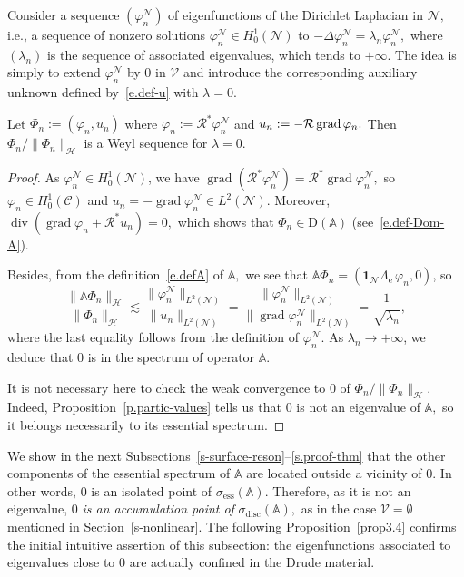 \documentclass[AHL,Unicode,longabstracts]{cedram}
\DeclareMathOperator{\Div}{div}
\DeclareMathOperator{\grad}{grad}
\DeclareMathOperator{\ess}{ess}
\DeclareMathOperator{\disc}{disc}
\newcommand{\calC}{\mathcal{C}}
\newcommand{\calH}{\mathcal{H}}
\newcommand{\calN}{\mathcal{N}}
\newcommand{\calR}{\mathcal{R}}
\newcommand{\calV}{\mathcal{V}}
\newcommand{\bbA}{\mathbb{A}}
\newcommand{\rmD}{{\mathrm{D}}}
\newcommand{\Un}{\boldsymbol{1}}
\newcommand{\Le}{{\Lambda_{\mathrm{e}}}}
\begin{document}
Consider a sequence $(\varphi_n^\calN)$ of eigenfunctions of the Dirichlet Laplacian in $\calN,$ i.e., a sequence of nonzero solutions $\varphi_n^\calN \in H^1_0(\calN)$ to $-\Delta \varphi_n^\calN = \lambda_n \varphi_n^\calN,$ where $(\lambda_n)$ is the sequence of associated eigenvalues, which tends to $+\infty.$ The idea is simply to extend $\varphi_n^\calN$ by 0 in $\calV$ and introduce the corresponding auxiliary unknown defined by~\eqref{e.def-u} with $\lambda=0.$
\pagebreak


\begin{prop}\label{p-Weyl-bulk}
Let $\Phi_n := (\varphi_n,u_n)$ where $\varphi_n := \calR^* \varphi_n^\calN$ and $u_n :=\linebreak- \calR \grad \varphi_n.$ Then $\Phi_n/\|\Phi_n\|_\calH$ is a Weyl sequence for $\lambda = 0.$
\end{prop}


\begin{proof}
As $\varphi_n^\calN \in H_0^1(\calN)$, we have $\grad (\calR^* \varphi_n^\calN) = \calR^* \grad \varphi_n^\calN,$ so $\varphi_n \in H_0^1(\calC)$ and $u_n = - \grad \varphi_n^\calN \in L^2(\calN)$. Moreover, $\Div (\grad \varphi_n + \calR^* u_n) = 0,$ which shows that $\Phi_n \in \rmD(\bbA)$ (see~\eqref{e.def-Dom-A}).

Besides, from the definition~\eqref{e.defA} of $\bbA,$ we see that $\bbA \Phi_n = (\Un_\calN \Le \, \varphi_n,0)$, so
\[
\frac{\| \bbA \Phi_n \|_\calH}{\| \Phi_n \|_\calH}
\lesssim \frac{ \| \varphi_n^\calN \|_{L^2(\calN)} }{\| u_n \|_{L^2(\calN)}} = \frac{ \| \varphi_n^\calN \|_{L^2(\calN)} }{\| \grad \varphi_n^\calN \|_{L^2(\calN)}} = \frac{1}{\sqrt{\lambda_n}},
\]
where the last equality follows from the definition of $\varphi_n^\calN.$ As $\lambda_n \to +\infty$, we deduce that $0$ is in the spectrum of operator $\bbA$.

It is not necessary here to check the weak convergence to 0 of $\Phi_n/\|\Phi_n\|_\calH.$ Indeed, Proposition~\ref{p.partic-values} tells us that $0$ is not an eigenvalue of $\bbA,$ so it belongs necessarily to its essential spectrum.
\end{proof}

We show in the next Subsections~\ref{s-surface-reson}--\ref{s.proof-thm} that the other components of the essential spectrum of $\bbA$ are located outside a vicinity of $0.$ In other words, $0$ is an isolated point of $\sigma_{\ess}(\bbA).$ Therefore, as it is not an eigenvalue, $0$ \emph{is an accumulation point of} $\sigma_{\disc}(\bbA),$ as in the case $\calV = \emptyset$ mentioned in Section~\ref{s-nonlinear}. The following Proposition~\ref{prop3.4} confirms the initial intuitive assertion of this subsection: the eigenfunctions associated to eigenvalues close to 0 are actually confined in the Drude material.
\end{document}
